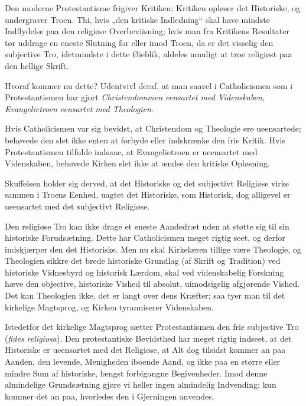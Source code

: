 \documentclass[12pt,a4paper]{book}
\newcommand{\opage}[1]{\marginnote{\footnotesize\textit{[#1]}}}
\begin{document}
Den moderne Protestantisme frigiver Kritiken; Kritiken opløser det Historiske,
og undergraver Troen. Thi, hvis „den kritiske
\opage{18} Indledning“ skal have mindste Indflydelse paa den religiøse Overbeviisning;
hvis man fra Kritikens Resultater tør uddrage en eneste Slutning for eller imod
Troen, da er det visselig den subjective Tro, idetmindste i dette Øieblik,
aldeles umuligt at troe religiøst paa den hellige Skrift.

Hvoraf kommer nu dette? Udentvivl deraf, at man saavel i Catholicismen som i
Protestantismen har gjort \emph{Christendommen eensartet med Videnskaben,
Evangelietroen eensartet med Theologien}.

Hvis Catholicismen var sig bevidst, at Christendom og Theologie ere
ueensartede; behøvede den slet ikke enten at forbyde eller indskrænke den frie
Kritik. Hvis Protestantismen tilfulde indsaae, at Evangelietroen er ueensartet
med Videnskaben, behøvede Kirken slet ikke at ændse den kritiske Opløsning.

Skuffelsen holder sig derved, at det Historiske og det subjectivt Religiøse
virke sammen i Troens Eenhed, uagtet det Historiske, som Historisk, dog
alligevel er ueensartet med det subjectivt Religiøse.

Den religiøse Tro kan ikke drage et eneste Aandedræt uden at støtte sig til sin
historiske Forudsætning. Dette har Catholicismen meget rigtig seet, og derfor
indskjærper den det Historiske. Men nu skal Kirkelæren tillige være Theologie,
og Theologien sikkre det brede historiske Grundlag (af Skrift og Tradition) ved
historiske Vidnesbyrd og historisk Lærdom, skal ved videnskabelig Forskning
hæve den objective, historiske Vished til absolut, uimodsigelig afgjørende
Vished. Det kan Theologien ikke, det er langt over dens Kræfter; saa tyer man
til det kirkelige Magtsprog, og Kirken tyranniserer Videnskaben.

Istedetfor det kirkelige Magtsprog sætter Protestantismen den frie subjective
Tro (\textit{fides religiosa}). Den protestantiske Bevidsthed har meget rigtig
indseet, at det Historiske er ueensartet med det Religiøse, at Alt dog tilsidst
kommer an paa Aanden, den
\opage{19} levende, Menigheden iboende Aand, og ikke paa en større eller mindre Sum af
historiske, længst forbigangne Begivenheder. Imod denne almindelige
Grundsætning gjøre vi heller ingen almindelig Indvending; kun kommer det an
paa, hvorledes den i Gjerningen anvendes.
\end{document}
